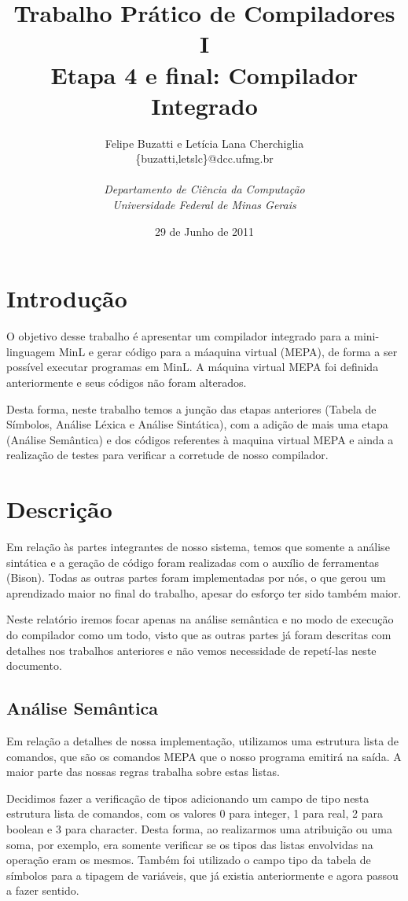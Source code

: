 \documentclass[a4paper,12pt]{article}
\title{\textbf{Trabalho Prático de Compiladores I \\ Etapa 4 e final: Compilador Integrado}}
\author{
        Felipe Buzatti e Letícia Lana Cherchiglia \\
	\{buzatti,letslc\}@dcc.ufmg.br \\ \\
        \textit{Departamento de Ciência da Computação}\\
        \textit{Universidade Federal de Minas Gerais}\\
}
\date{29 de Junho de 2011}
\begin{document}
\maketitle

\section{Introdução}
\label{intro}

O objetivo desse trabalho é apresentar um compilador integrado para a mini-linguagem MinL e gerar código para a máaquina virtual (MEPA), de forma a ser possível executar programas em MinL. A máquina virtual MEPA foi definida anteriormente e seus códigos não foram alterados.

Desta forma, neste trabalho temos a junção das etapas anteriores (Tabela de Símbolos, Análise Léxica e Análise Sintática), com a adição de mais uma etapa (Análise Semântica) e dos códigos referentes à maquina virtual MEPA e ainda a realização de testes para verificar a corretude de nosso compilador.

\section{Descrição}
Em relação às partes integrantes de nosso sistema, temos que somente a análise sintática e a geração de código foram realizadas com o auxílio de ferramentas (Bison). Todas as outras partes foram implementadas por nós, o que gerou um aprendizado maior no final do trabalho, apesar do esforço ter sido também maior. 

Neste relatório iremos focar apenas na análise semântica e no modo de execução do compilador como um todo, visto que as outras partes já foram descritas com detalhes nos trabalhos anteriores e não vemos necessidade de repetí-las neste documento.

\subsection{Análise Semântica}

Em relação a detalhes de nossa implementação, utilizamos uma estrutura lista de comandos, que são os comandos MEPA que o nosso programa emitirá na saída. A maior parte das nossas regras trabalha sobre estas listas. 

Decidimos fazer a verificação de tipos adicionando um campo de tipo nesta estrutura lista de comandos, com os valores 0 para integer, 1 para real, 2 para boolean e 3 para character. Desta forma, ao realizarmos uma atribuição ou uma soma, por exemplo, era somente verificar se os tipos das listas envolvidas na operação eram os mesmos. Também foi utilizado o campo tipo da tabela de símbolos para a tipagem de variáveis, que já existia anteriormente e agora passou a fazer sentido. 
\end{document}
